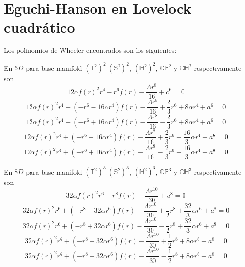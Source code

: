 \newpage
\section{Eguchi-Hanson en Lovelock cuadrático}
Los polinomios de Wheeler encontrados son los siguientes:

En $6 D$ para base manifold $(\mathbb{T}^2)^2$,$(\mathbb{S}^2)^2$, $(\mathbb{H}^2)^2$, $\mathbb{CP}^2$ y $\mathbb{CH}^2$ respectivamente son
\begin{equation*}
    12\alpha f(r)^2r^4-r^6f(r)-\frac{\Lambda r^8}{16}+a^6=0
\end{equation*}
\begin{equation*}
    12\alpha f(r)^2 r^4+(-r^6-16\alpha r^4)f(r)-\frac{\Lambda r^8}{16}+\frac{2}{3}r^6+8\alpha r^4+a^6=0
\end{equation*}
\begin{equation*}
    12\alpha f(r)^2 r^4+(-r^6+16\alpha r^4)f(r)-\frac{\Lambda r^8}{16}-\frac{2}{3}r^6+8\alpha r^4+a^6=0
\end{equation*}
\begin{equation*}
    12\alpha f(r)^2 r^4+(-r^6-16\alpha r^4)f(r)-\frac{\Lambda r^8}{16}+\frac{2}{3}r^6+\frac{16}{3}\alpha r^4+a^6=0
\end{equation*}
\begin{equation*}
    12\alpha f(r)^2 r^4+(-r^6+16\alpha r^4)f(r)-\frac{\Lambda r^8}{16}-\frac{2}{3}r^6+\frac{16}{3}\alpha r^4+a^6=0
\end{equation*}

En $8 D$ para base manifold $(\mathbb{T}^2)^3$,$(\mathbb{S}^2)^3$, $(\mathbb{H}^2)^3$, $\mathbb{CP}^3$ y $\mathbb{CH}^3$ respectivamente son
\begin{equation*}
    32\alpha f(r)^2r^6-r^8f(r)-\frac{\Lambda r^{10}}{30}+a^8=0
\end{equation*}
\begin{equation*}
    32\alpha f(r)^2 r^6+(-r^8-32\alpha r^6)f(r)-\frac{\Lambda r^{10}}{30}+\frac{1}{2}r^8+\frac{32}{3}\alpha r^6+a^8=0
\end{equation*}
\begin{equation*}
    32\alpha f(r)^2 r^6+(-r^8+32\alpha r^6)f(r)-\frac{\Lambda r^{10}}{30}-\frac{1}{2}r^8+\frac{32}{3}\alpha r^6+a^8=0
\end{equation*}
\begin{equation*}
    32\alpha f(r)^2 r^6+(-r^8-32\alpha r^6)f(r)-\frac{\Lambda r^{10}}{30}+\frac{1}{2}r^8+8\alpha r^6+a^8=0
\end{equation*}
\begin{equation*}
    32\alpha f(r)^2 r^6+(-r^8+32\alpha r^6)f(r)-\frac{\Lambda r^{10}}{30}-\frac{1}{2}r^8+8\alpha r^6+a^8=0
\end{equation*}

